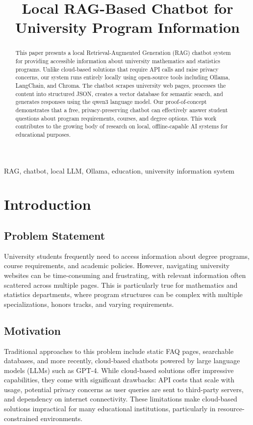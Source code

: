 \documentclass[conference]{IEEEtran}
\title{Local RAG-Based Chatbot for University Program Information}
\author{
    \IEEEauthorblockN{Student Name}
    \IEEEauthorblockA{Department of Computer Science\\University of Alberta\\Edmonton, Alberta, Canada}
}
\begin{document}
\maketitle

\begin{abstract}
This paper presents a local Retrieval-Augmented Generation (RAG) chatbot system for providing accessible information about university mathematics and statistics programs. Unlike cloud-based solutions that require API calls and raise privacy concerns, our system runs entirely locally using open-source tools including Ollama, LangChain, and Chroma. The chatbot scrapes university web pages, processes the content into structured JSON, creates a vector database for semantic search, and generates responses using the qwen3 language model. Our proof-of-concept demonstrates that a free, privacy-preserving chatbot can effectively answer student questions about program requirements, courses, and degree options. This work contributes to the growing body of research on local, offline-capable AI systems for educational purposes.
\end{abstract}

\IEEEkeywords
RAG, chatbot, local LLM, Ollama, education, university information system

\section{Introduction}
\label{sec:introduction}

\subsection{Problem Statement}
University students frequently need to access information about degree programs, course requirements, and academic policies. However, navigating university websites can be time-consuming and frustrating, with relevant information often scattered across multiple pages. This is particularly true for mathematics and statistics departments, where program structures can be complex with multiple specializations, honors tracks, and varying requirements.

\subsection{Motivation}
Traditional approaches to this problem include static FAQ pages, searchable databases, and more recently, cloud-based chatbots powered by large language models (LLMs) such as GPT-4. While cloud-based solutions offer impressive capabilities, they come with significant drawbacks: API costs that scale with usage, potential privacy concerns as user queries are sent to third-party servers, and dependency on internet connectivity. These limitations make cloud-based solutions impractical for many educational institutions, particularly in resource-constrained environments.
\end{document}
